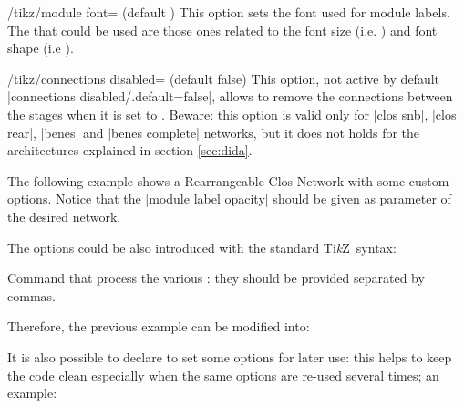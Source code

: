 \documentclass{ltxdoc}
\newcommand\Tikz{Ti\textit kZ}
\begin{document}
\begin{key}{/tikz/module font= (default )}
    This option sets the font used for module labels. The  that could be used are those ones related to the font size (i.e. ) and font shape (i.e ).
\end{key}

\begin{key}{/tikz/connections disabled= (default false)}
	This option, not active by default |connections disabled/.default=false|, allows to remove the connections between the stages when it is set to . Beware: this option is valid only for |clos snb|, |clos rear|, |benes| and |benes complete| networks, but it does not holds for the architectures explained in section \ref{sec:dida}.
\end{key}

The following example shows a Rearrangeable Clos Network with some custom options. Notice that the |module label opacity| should be given as parameter of the desired network.

\begin{codeexample}[]
\begin{tikzpicture}[N=9,r1=3,M=9,r3=3]
    \node[module size=0.5cm,pin length factor=0.5,
        module ysep=1, module xsep=1.25,
        clos rear={module label opacity=0}] {};
\end{tikzpicture}
\end{codeexample}

The options could be also introduced with the standard \Tikz\ syntax:
\begin{command}{{\tikzset}}
    Command that process the various : they should be provided separated by commas.
\end{command}

Therefore, the previous example can be modified into:
\begin{codeexample}[]
\tikzset{module size=0.5cm,pin length factor=0.5,
         module ysep=1, module xsep=1.25,}
\begin{tikzpicture}[N=9,r1=3,M=9,r3=3]
    \node[clos rear={module label opacity=0}] {};
\end{tikzpicture}
\end{codeexample}

It is also possible to declare  to set some options for later use: this helps to keep the code clean especially when the same options are re-used several times; an example:
\begin{codeexample}
\tikzset{module size definition, 
 P=16,
}
\begin{tikzpicture}
    \node[benes] {};
\end{tikzpicture}
\end{codeexample}
\end{document}
